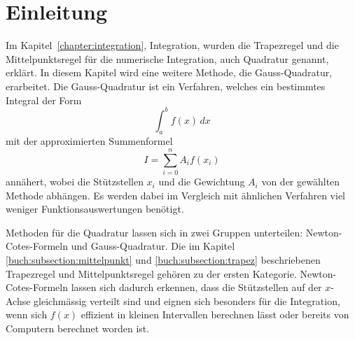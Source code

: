%
%
%
\section{Einleitung\label{quadratur:section:einleitung}}

Im Kapitel~\ref{chapter:integration}, Integration, wurden die 
Trapezregel und die Mittelpunktsregel für die numerische Integration, 
%
%
auch Quadratur genannt, erklärt. 
%
In diesem Kapitel wird eine weitere Methode, die Gauss-Quadratur, erarbeitet.
Die Gauss-Quadratur ist ein Verfahren, welches ein bestimmtes Integral der Form
%
\begin{equation}
    \int_{a}^{b} f(x) \,dx
\end{equation}
mit der approximierten Summenformel
\begin{equation} \label{quadratur:equation:quadraturapproxsumme}
    I = \sum_{i=0}^{n} A_i f(x_i)
\end{equation}
annähert, wobei die Stützstellen $x_i$ und die Gewichtung $A_i$ von der gewählten 
Methode abhängen. 
Es werden dabei im Vergleich mit ähnlichen Verfahren viel weniger Funktionsauswertungen benötigt.

Methoden für die Quadratur lassen sich in zwei Gruppen unterteilen: 
Newton-Cotes-Formeln und Gauss-Quadratur.
Die im Kapitel \ref{buch:subsection:mittelpunkt} und \ref{buch:subsection:trapez} beschriebenen
Trapezregel und Mittelpunktsregel gehören zu der ersten Kategorie.
%
%
Newton-Cotes-Formeln lassen sich dadurch erkennen, dass die Stützstellen auf der $x$-Achse 
gleichmässig verteilt sind und eignen sich besonders für die Integration, wenn sich $f(x)$ 
effizient in kleinen Intervallen berechnen lässt oder bereits von Computern berechnet worden ist.







